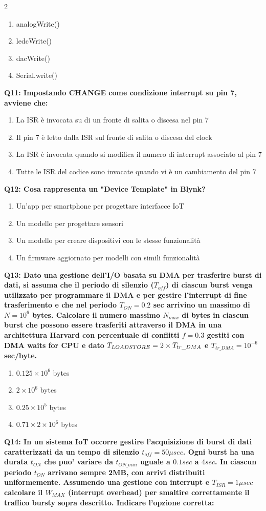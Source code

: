 \documentclass[10pt]{article}
\begin{document}
\begin{multicols}{2}
\begin{enumerate}[label=\arabic*.]
\item analogWrite()
\item ledcWrite()
\item dacWrite()
\item Serial.write()
\end{enumerate}
\textbf{Q11: Impostando CHANGE come condizione interrupt su pin 7, avviene che:}

\begin{enumerate}[label=\arabic*.]
\item La ISR è invocata su di un fronte di salita o discesa nel pin 7
\item Il pin 7 è letto dalla ISR sul fronte di salita o discesa del clock
\item La ISR è invocata quando si modifica il numero di interrupt associato al pin 7
\item Tutte le ISR del codice sono invocate quando vi è un cambiamento del pin 7
\end{enumerate}
\textbf{Q12: Cosa rappresenta un "Device Template" in Blynk?}

\begin{enumerate}[label=\arabic*.]
\item Un'app per smartphone per progettare interfacce IoT
\item Un modello per progettare sensori
\item Un modello per creare dispositivi con le stesse funzionalità
\item Un firmware aggiornato per modelli con simili funzionalità
\end{enumerate}
\textbf{Q13: Dato una gestione dell’I/O basata su DMA per trasferire burst di dati, si assuma che il periodo di silenzio  ($T_{off}$) di ciascun burst venga utilizzato per programmare il DMA e per gestire l’interrupt di fine trasferimento e che nel periodo $T_{ON} = 0.2$ sec arrivino un massimo di $N=10^6$ bytes. Calcolare il numero massimo $N_{max}$ di bytes in ciascun burst che possono essere trasferiti attraverso il DMA in una architettura Harvard con percentuale di conflitti $f = 0.3$ gestiti con DMA waits for CPU e dato $T_{LOAD\/STORE} = 2 \times T_{tr\_DMA}$ e $T_{tr\_DMA} = 10^{-6}$ sec/byte.}

\begin{enumerate}[label=\arabic*.]
\item $0.125 \times 10^6$ bytes
\item $2 \times 10^6$ bytes
\item $0.25 \times 10^5$ bytes
\item $0.71 \times 2 \times 10^6$ bytes
\end{enumerate}
\textbf{Q14: In un sistema IoT occorre gestire l'acquisizione di burst di dati caratterizzati da un tempo di silenzio $t_{off}=50\mu sec$. Ogni burst ha una durata $t_{ON}$ che puo' variare da $t_{ON\_min}$ uguale a $0.1 sec$ a $4 sec$. In ciascun periodo $t_{ON}$ arrivano sempre 2MB, con arrivi distribuiti uniformemente.  Assumendo una gestione con interrupt e $T_{ISR}=1 \mu sec$ calcolare il $W_{MAX}$ (interrupt overhead) per smaltire correttamente il traffico bursty sopra descritto.  Indicare l'opzione corretta:}


\end{multicols}
\end{document}
